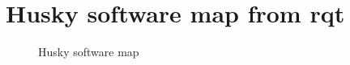 \appendix

\chapter{Husky software map from rqt}
\begin{figure}[H]
    \centering
    
    \caption{Husky software map}
    \label{fig:HuskySW}
\end{figure}